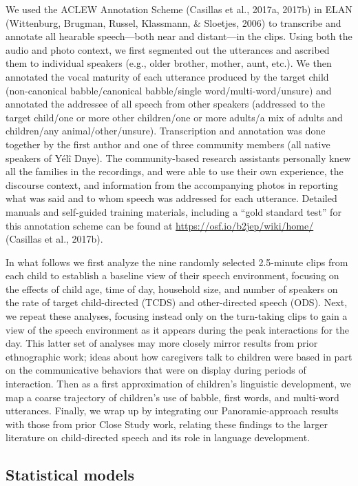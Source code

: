 \documentclass[,man,mask,floatsintext]{apa6}
\begin{document}
We used the ACLEW Annotation Scheme (Casillas et al., 2017a, 2017b) in
ELAN (Wittenburg, Brugman, Russel, Klassmann, \& Sloetjes, 2006) to
transcribe and annotate all hearable speech---both near and distant---in
the clips. Using both the audio and photo context, we first segmented
out the utterances and ascribed them to individual speakers (e.g., older
brother, mother, aunt, etc.). We then annotated the vocal maturity of
each utterance produced by the target child (non-canonical
babble/canonical babble/single word/multi-word/unsure) and annotated the
addressee of all speech from other speakers (addressed to the target
child/one or more other children/one or more adults/a mix of adults and
children/any animal/other/unsure). Transcription and annotation was done
together by the first author and one of three community members (all
native speakers of Yélî Dnye). The community-based research assistants
personally knew all the families in the recordings, and were able to use
their own experience, the discourse context, and information from the
accompanying photos in reporting what was said and to whom speech was
addressed for each utterance. Detailed manuals and self-guided training
materials, including a \enquote{gold standard test} for this annotation
scheme can be found at \url{https://osf.io/b2jep/wiki/home/} (Casillas
et al., 2017b).

In what follows we first analyze the nine randomly selected 2.5-minute
clips from each child to establish a baseline view of their speech
environment, focusing on the effects of child age, time of day,
household size, and number of speakers on the rate of target
child-directed (TCDS) and other-directed speech (ODS). Next, we repeat
these analyses, focusing instead only on the turn-taking clips to gain a
view of the speech environment as it appears during the peak
interactions for the day. This latter set of analyses may more closely
mirror results from prior ethnographic work; ideas about how caregivers
talk to children were based in part on the communicative behaviors that
were on display during periods of interaction. Then as a first
approximation of children's linguistic development, we map a coarse
trajectory of children's use of babble, first words, and multi-word
utterances. Finally, we wrap up by integrating our Panoramic-approach
results with those from prior Close Study work, relating these findings
to the larger literature on child-directed speech and its role in
language development.

\subsection{Statistical models}\label{statistical-models}
\end{document}
